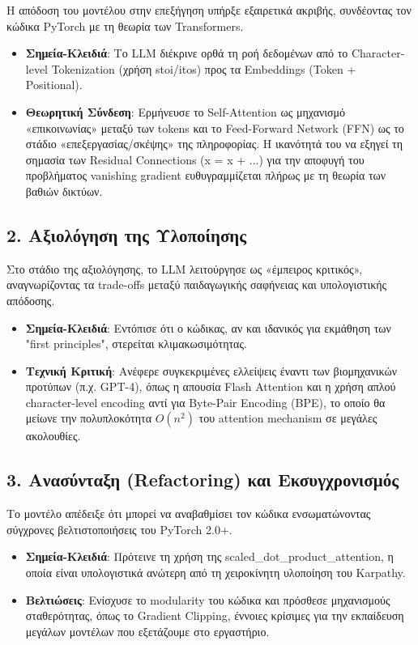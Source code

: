 \documentclass[12pt]{article}
\begin{document}
Η απόδοση του μοντέλου στην επεξήγηση υπήρξε εξαιρετικά ακριβής, συνδέοντας τον κώδικα PyTorch με τη θεωρία των Transformers.

\begin{itemize}
    \item \textbf{Σημεία-Κλειδιά}: Το LLM διέκρινε ορθά τη ροή δεδομένων από το Character-level Tokenization (χρήση stoi/itos) προς τα Embeddings (Token + Positional).
    \item \textbf{Θεωρητική Σύνδεση}: Ερμήνευσε το Self-Attention ως μηχανισμό «επικοινωνίας» μεταξύ των tokens και το Feed-Forward Network (FFN) ως το στάδιο «επεξεργασίας/σκέψης» της πληροφορίας. Η ικανότητά του να εξηγεί τη σημασία των Residual Connections (x = x + ...) για την αποφυγή του προβλήματος vanishing gradient ευθυγραμμίζεται πλήρως με τη θεωρία των βαθιών δικτύων.
\end{itemize}


\subsection*{2. Αξιολόγηση της Υλοποίησης}
Στο στάδιο της αξιολόγησης, το LLM λειτούργησε ως «έμπειρος κριτικός», αναγνωρίζοντας τα trade-offs μεταξύ παιδαγωγικής σαφήνειας και υπολογιστικής απόδοσης.
\begin{itemize}
    \item \textbf{Σημεία-Κλειδιά}: Εντόπισε ότι ο κώδικας, αν και ιδανικός για εκμάθηση των "first principles", στερείται κλιμακωσιμότητας.
    \item \textbf{Τεχνική Κριτική}: Ανέφερε συγκεκριμένες ελλείψεις έναντι των βιομηχανικών προτύπων (π.χ. GPT-4), όπως η απουσία Flash Attention και η χρήση απλού character-level encoding αντί για Byte-Pair Encoding (BPE), το οποίο θα μείωνε την πολυπλοκότητα $O(n^2)$ του attention mechanism σε μεγάλες ακολουθίες.
\end{itemize}


\subsection*{3. Ανασύνταξη (Refactoring) και Εκσυγχρονισμός}
Το μοντέλο απέδειξε ότι μπορεί να αναβαθμίσει τον κώδικα ενσωματώνοντας σύγχρονες βελτιστοποιήσεις του PyTorch 2.0+.
\begin{itemize}
    \item \textbf{Σημεία-Κλειδιά}: Πρότεινε τη χρήση της scaled\_dot\_product\_attention, η οποία είναι υπολογιστικά ανώτερη από τη χειροκίνητη υλοποίηση του Karpathy.
    \item \textbf{Βελτιώσεις}: Ενίσχυσε το modularity του κώδικα και πρόσθεσε μηχανισμούς σταθερότητας, όπως το Gradient Clipping, έννοιες κρίσιμες για την εκπαίδευση μεγάλων μοντέλων που εξετάζουμε στο εργαστήριο.
\end{itemize}
\end{document}
